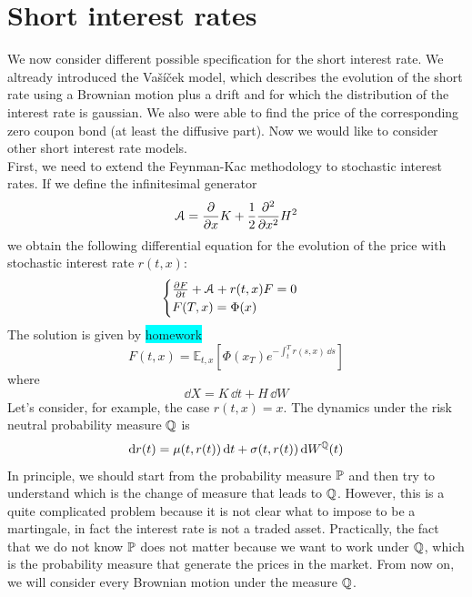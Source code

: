 \section{Short interest rates}
We now consider different possible specification for the short interest rate. We altready introduced the Vašíček model, which describes the evolution of the short rate using a Brownian motion plus a drift and for which the distribution of the interest rate is gaussian. We also were able to find the price of the corresponding zero coupon bond (at least the diffusive part). Now we would like to consider other short interest rate models. \\
First, we need to extend the Feynman-Kac methodology to stochastic interest rates. If we define the infinitesimal generator
\begin{equation*}
    \mathcal{A} = \pdv{}{x}K + \frac{1}{2}\pdv[2]{}{x}H^2
\end{equation*}
we obtain the following differential equation for the evolution of the price with stochastic interest rate $r(t,x)$:
\begin{equation}
    \begin{cases}
        \pdv{F}{t} + \mathcal{A} + r(t,x)F = 0 \\
        F(T,x) = \Phi(x)
    \end{cases}
\end{equation}
The solution is given by \colorbox{cyan}{homework}
\begin{equation}
    F(t,x) = \mathbb{E}_{t,x}\left[\Phi(x_T)e^{-\int_t^T r(s,x)\,\dd s}\right]
\end{equation}
where
\begin{equation}
    \dd X = K\,\dd t + H\,\dd W
\end{equation}
Let's consider, for example, the case $r(t,x) = x$. The dynamics under the risk neutral probability measure $\mathbb{Q}$ is
\begin{equation}
    \dd r(t) = \mu(t,r(t))\,\dd t + \sigma(t,r(t))\,\dd W^{\mathbb{Q}}(t)
\end{equation}
In principle, we should start from the probability measure $\mathbb{P}$ and then try to understand which is the change of measure that leads to $\mathbb{Q}$. However, this is a quite complicated problem because it is not clear what to impose to be a martingale, in fact the interest rate is not a traded asset. Practically, the fact that we do not know $\mathbb{P}$ does not matter because we want to work under $\mathbb{Q}$, which is the probability measure that generate the prices in the market. From now on, we will consider every Brownian motion under the measure $\mathbb{Q}$.

